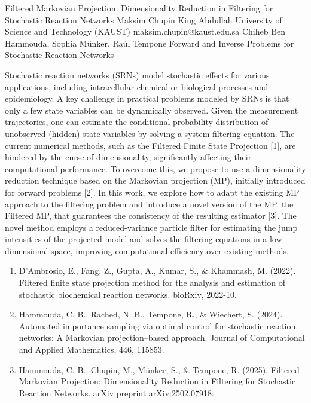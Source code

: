 \begin{talk}
  {Filtered Markovian Projection: Dimensionality Reduction in Filtering for Stochastic Reaction Networks}%
  {Maksim Chupin}%
  {King Abdullah University of Science and Technology (KAUST)}%
  {maksim.chupin@kaust.edu.sa}%
  {Chiheb Ben Hammouda, Sophia M\"{u}nker, Ra\'{u}l Tempone}%
  {Forward and Inverse Problems for Stochastic Reaction Networks}%
    
   
Stochastic reaction networks (SRNs) model stochastic effects for various applications, including intracellular chemical or biological processes and epidemiology. A key challenge in practical problems modeled by SRNs is that only a few state variables can be dynamically observed. Given the measurement trajectories, one can estimate the conditional probability distribution of unobserved (hidden) state variables by solving a system filtering equation. The current numerical methods, such as the Filtered Finite State Projection [1], are hindered by the curse of dimensionality, significantly affecting their computational performance. To overcome this, we propose to use a dimensionality reduction technique based on the Markovian projection (MP), initially introduced for forward problems [2]. In this work, we explore how to adapt the existing MP approach to the filtering problem and introduce a novel version of the MP, the Filtered MP, that guarantees the consistency of the resulting estimator [3]. The novel method employs a reduced-variance particle filter for estimating the jump intensities of the projected model and solves the filtering equations in a low-dimensional space, improving computational efficiency over existing methods.





\medskip

\begin{enumerate}
 \item[{[1]}] D’Ambrosio, E., Fang, Z., Gupta, A., Kumar, S., \& Khammash, M. (2022). Filtered finite state projection method for the analysis and estimation of stochastic biochemical reaction networks. bioRxiv, 2022-10.
 \item[{[2]}] Hammouda, C. B., Rached, N. B., Tempone, R., \& Wiechert, S. (2024). Automated importance sampling via optimal control for stochastic reaction networks: A Markovian projection--based approach. Journal of Computational and Applied Mathematics, 446, 115853.
    \item [{[3]}] Hammouda, C. B., Chupin, M., M\"unker, S., \& Tempone, R. (2025). Filtered Markovian Projection: Dimensionality Reduction in Filtering for Stochastic Reaction Networks. arXiv preprint arXiv:2502.07918.
\end{enumerate}


\end{talk}

